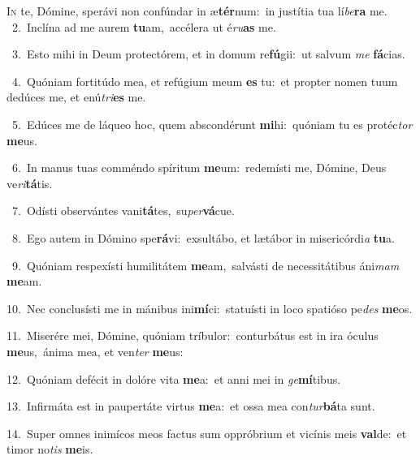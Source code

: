 \lettrine{\initial\textcolor{\initialcolor}{I}}{n} te, Dómine, sperávi non confúndar in æ\-\textbf{tér}\-num:~\star in justítia tua lí\-\textit{be}\-\textbf{ra} me.\\
{\numbfont\textcolor{\numbcolor}{~2.}}~Inclína ad me aurem \textbf{tu}\-am,~\star accélera ut é\-\textit{ru}\-\textbf{as} me.\par
{\numbfont\textcolor{\numbcolor}{~3.}}~Esto mihi in Deum protectórem, et in domum re\-\textbf{fú}\-gii:~\star ut salvum \textit{me} \textbf{fá}\-cias.\par
{\numbfont\textcolor{\numbcolor}{~4.}}~Quóniam fortitúdo mea, et refúgium meum \textbf{es} tu:~\star et propter nomen tuum dedúces me, et enú\-\textit{tri}\-\textbf{es} me.\par
{\numbfont\textcolor{\numbcolor}{~5.}}~Edúces me de láqueo hoc, quem abscondérunt \textbf{mi}\-hi:~\star quóniam tu es protéc\textit{tor} \textbf{me}\-us.\par
{\numbfont\textcolor{\numbcolor}{~6.}}~In manus tuas comméndo spíritum \textbf{me}\-um:~\star redemísti me, Dómine, Deus ve\-\textit{ri}\-\textbf{tá}tis.\par
{\numbfont\textcolor{\numbcolor}{~7.}}~Odísti observántes vani\-\textbf{tá}\-tes,~\star su\-\textit{per}\-\textbf{vá}cue.\par
{\numbfont\textcolor{\numbcolor}{~8.}}~Ego autem in Dómino spe\-\textbf{rá}\-vi:~\star exsultábo, et lætábor in misericórdi\textit{a} \textbf{tu}\-a.\par
{\numbfont\textcolor{\numbcolor}{~9.}}~Quóniam respexísti humilitátem \textbf{me}\-am,~\star salvásti de necessitátibus áni\textit{mam} \textbf{me}\-am.\par
{\numbfont\textcolor{\numbcolor}{10.}}~Nec conclusísti me in mánibus ini\-\textbf{mí}\-ci:~\star statuísti in loco spatióso pe\textit{des} \textbf{me}\-os.\par
{\numbfont\textcolor{\numbcolor}{11.}}~Miserére mei, Dómine, quóniam tríbulor:~\dagger conturbátus est in ira óculus \textbf{me}\-us,~\star ánima mea, et ven\textit{ter} \textbf{me}\-us:\par
{\numbfont\textcolor{\numbcolor}{12.}}~Quóniam defécit in dolóre vita \textbf{me}\-a:~\star et anni mei in \textit{ge}\-\textbf{mí}tibus.\par
{\numbfont\textcolor{\numbcolor}{13.}}~Infirmáta est in paupertáte virtus \textbf{me}\-a:~\star et ossa mea con\-\textit{tur}\-\textbf{bá}ta sunt.\par
{\numbfont\textcolor{\numbcolor}{14.}}~Super omnes inimícos meos factus sum oppróbrium et vicínis meis \textbf{val}\-de:~\star et timor no\textit{tis} \textbf{me}\-is.\par
